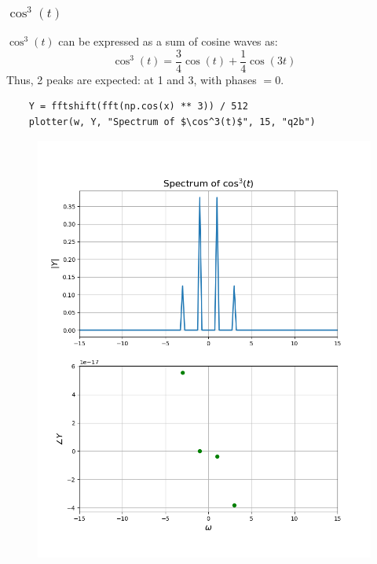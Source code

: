 \documentclass[12pt, a4paper]{article}
\begin{document}
\subsubsection{$\cos^3(t)$}
$\cos^3(t)$ can be expressed as a sum of cosine waves as:
\begin{equation*}
    \cos^3(t) = \frac{3}{4}\cos(t) + \frac{1}{4}\cos(3t)
\end{equation*}
Thus, 2 peaks are expected: at 1 and 3, with phases $= 0$.
\begin{lstlisting}
    Y = fftshift(fft(np.cos(x) ** 3)) / 512
    plotter(w, Y, "Spectrum of $\cos^3(t)$", 15, "q2b")
\end{lstlisting}
\begin{figure}[H]
    \centering
    \includegraphics[scale=0.6]{q2b.png}
\end{figure}
\end{document}
